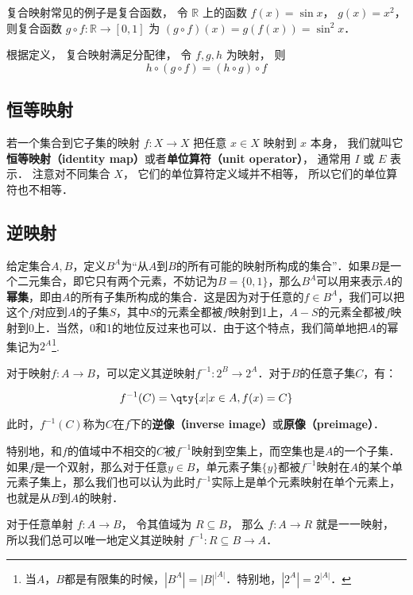 复合映射常见的例子是复合函数， 令 $\mathbb R$ 上的函数 $f(x) = \sin x$， $g(x) = x^2$， 则复合函数 $g\circ f: \mathbb R \to [0, 1]$ 为 $(g\circ f)(x) = g(f(x)) = \sin^2 x$．

根据定义， 复合映射满足分配律， 令 $f, g, h$ 为映射， 则
\begin{equation}
h \circ (g \circ f) = (h \circ g) \circ f
\end{equation}

\subsection{恒等映射}
若一个集合到它子集的映射 $f:X\to X$ 把任意 $x\in X$ 映射到 $x$ 本身， 我们就叫它\textbf{恒等映射（identity map）}或者\textbf{单位算符（unit operator）}， 通常用 $I$ 或 $E$ 表示． 注意对不同集合 $X$， 它们的单位算符定义域并不相等， 所以它们的单位算符也不相等．



\subsection{逆映射}

给定集合$A, B$，定义$B^A$为“从$A$到$B$的所有可能的映射所构成的集合”．如果$B$是一个二元集合，即它只有两个元素，不妨记为$B=\{0,1\}$，那么$B^A$可以用来表示$A$的\textbf{幂集}，即由$A$的所有子集所构成的集合．这是因为对于任意的$f\in B^A$，我们可以把这个$f$对应到$A$的子集$S$，其中$S$的元素全都被$f$映射到1上，$A-S$的元素全都被$f$映射到0上．当然，0和1的地位反过来也可以．由于这个特点，我们简单地把$A$的幂集记为$2^A$\footnote{当$A$，$B$都是有限集的时候，$|B^A|=|B|^{|A|}$．特别地，$|2^A|=2^{|A|}．$}. 

对于映射$f:A\to B$，可以定义其逆映射$f^{-1}:2^B \to 2^A$．对于$B$的任意子集$C$，有：

\begin{equation}
f^{-1}(C) = \qty{x | x \in A, f(x) = C}
\end{equation}

此时，$f^{-1}(C)$称为$C$在$f$下的\textbf{逆像（inverse image）}或\textbf{原像（preimage）}．

特别地，和$f$的值域中不相交的$C$被$f^{-1}$映射到空集上，而空集也是$A$的一个子集．如果$f$是一个双射，那么对于任意$y\in B$，单元素子集$\{y\}$都被$f^{-1}$映射在$A$的某个单元素子集上，那么我们也可以认为此时$f^{-1}$实际上是单个元素映射在单个元素上，也就是从$B$到$A$的映射．

对于任意单射 $f:A\to B$， 令其值域为 $R \subseteq B$， 那么 $f:A\to R$ 就是一一映射， 所以我们总可以唯一地定义其逆映射 $f^{-1}:R \subseteq B \to A$．

